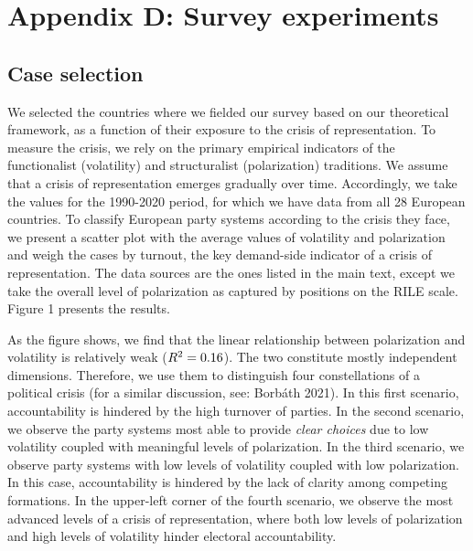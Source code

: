 \documentclass[12pt]{article}
\begin{document}
\newpage

\section{Appendix D: Survey experiments}

\setcounter{figure}{0}
\setcounter{table}{0}

\subsection{Case selection}

We selected the countries where we fielded our survey based on our theoretical framework, as a function of their exposure to the crisis of representation. To measure the crisis, we rely on the primary empirical indicators of the functionalist (volatility) and structuralist (polarization) traditions. We assume that a crisis of representation emerges gradually over time. Accordingly, we take the values for the 1990-2020 period, for which we have data from all 28 European countries. To classify European party systems according to the crisis they face, we present a scatter plot with the average values of volatility and polarization and weigh the cases by turnout, the key demand-side indicator of a crisis of representation. The data sources are the ones listed in the main text, except we take the overall level of polarization as captured by positions on the RILE scale. Figure 1 presents the results.

As the figure shows, we find that the linear relationship between polarization and volatility is relatively weak ($R\textsuperscript{2}=0.16$). The two constitute mostly independent dimensions. Therefore, we use them to distinguish four constellations of a political crisis (for a similar discussion, see: Borbáth 2021). In this first scenario, accountability is hindered by the high turnover of parties. In the second scenario, we observe the party systems most able to provide \textit{clear choices} due to low volatility coupled with meaningful levels of polarization. In the third scenario, we observe party systems with low levels of volatility coupled with low polarization. In this case, accountability is hindered by the lack of clarity among competing formations. In the upper-left corner of the fourth scenario, we observe the most advanced levels of a crisis of representation, where both low levels of polarization and high levels of volatility hinder electoral accountability.
\end{document}
